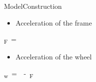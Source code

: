 %	
%		
%	
%	

\begin{frame}{Model}{Construction}
	\begin{itemize}
		\item Acceleration of the frame
	\end{itemize}
\small
	\begin{flalign}
\si{\ddot{\theta}_F = } \nonumber
	\end{flalign}
	\vspace{0.5cm}
\normalsize	
%
\begin{itemize}
	\item Acceleration of the wheel
\end{itemize}
\small
	\begin{flalign}
\si{\ddot{\theta}_w =  - \ddot{\theta}_F} \nonumber
	\end{flalign}
\normalsize
	
\end{frame}

